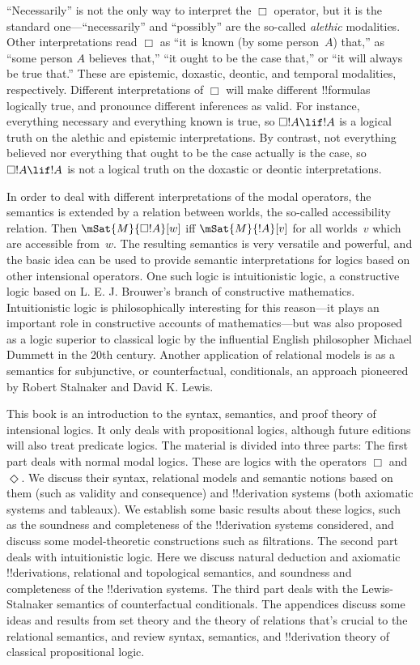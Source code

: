 ``Necessarily'' is not the only way to interpret the $\Box$ operator,
but it is the standard one---``necessarily'' and ``possibly'' are the
so-called \emph{alethic} modalities. Other interpretations read $\Box$
as ``it is known (by some person~$A$) that,'' as ``some person $A$
believes that,'' ``it ought to be the case that,'' or ``it will always
be true that.'' These are epistemic, doxastic, deontic, and temporal
modalities, respectively. Different interpretations of $\Box$ will
make different !!{formula}s logically true, and pronounce different
inferences as valid. For instance, everything necessary and everything
known is true, so $\Box !A \lif !A$ is a logical truth on the alethic
and epistemic interpretations. By contrast, not everything believed
nor everything that ought to be the case actually is the case, so
$\Box !A \lif !A$ is not a logical truth on the doxastic or deontic
interpretations. 

In order to deal with different interpretations of the modal
operators, the semantics is extended by a relation between worlds, the
so-called accessibility relation.  Then $\mSat{M}{\Box !A}[w]$ iff
$\mSat{M}{!A}[v]$ for all worlds~$v$ which are accessible from~$w$.
The resulting semantics is very versatile and powerful, and the basic
idea can be used to provide semantic interpretations for logics based
on other intensional operators. One such logic is intuitionistic
logic, a constructive logic based on L. E. J. Brouwer's branch of
constructive mathematics. Intuitionistic logic is philosophically
interesting for this reason---it plays an important role in
constructive accounts of mathematics---but was also proposed as a logic
superior to classical logic by the influential English philosopher
Michael Dummett in the 20th century. Another application of relational
models is as a semantics for subjunctive, or counterfactual,
conditionals, an approach pioneered by Robert Stalnaker and David K.
Lewis.

This book is an introduction to the syntax, semantics, and proof
theory of intensional logics. It only deals with propositional logics,
although future editions will also treat predicate logics.  The
material is divided into three parts: The first part deals with normal
modal logics. These are logics with the operators $\Box$
and~$\Diamond$. We discuss their syntax, relational models and
semantic notions based on them (such as validity and consequence) and
!!{derivation} systems (both axiomatic systems and tableaux). We establish some
basic results about these logics, such as the soundness and
completeness of the !!{derivation} systems considered, and discuss some
model-theoretic constructions such as filtrations. The second part
deals with intuitionistic logic. Here we discuss natural deduction and
axiomatic !!{derivation}s, relational and topological semantics, and
soundness and completeness of the !!{derivation} systems. The third part deals
with the Lewis-Stalnaker semantics of counterfactual conditionals. The
appendices discuss some ideas and results from set theory and the
theory of relations that's crucial to the relational semantics, and
review syntax, semantics, and !!{derivation} theory of classical propositional
logic.
\fi
